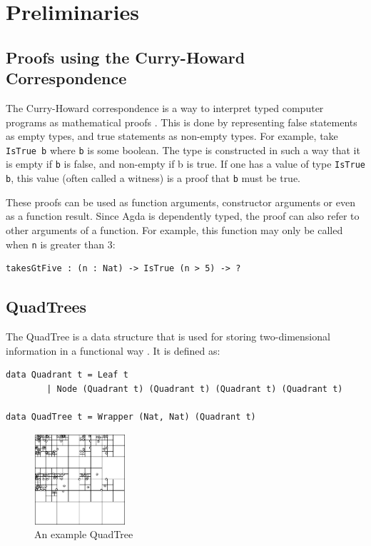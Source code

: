 \section{Preliminaries}
\subsection{Proofs using the Curry-Howard Correspondence}
The Curry-Howard correspondence is a way to interpret typed computer programs as mathematical proofs \cite{chc}. This is done by representing false statements as empty types, and true statements as non-empty types. For example, take  \verb|IsTrue b|  where  \verb|b| is some boolean. The type is constructed in such a way that it is empty if  \verb|b| is false, and non-empty if b is true.  If one has a value of type  \verb|IsTrue b|, this value (often called a witness) is a proof that  \verb|b| must be true. 

These proofs can be used as function arguments, constructor arguments or even as a function result. Since Agda is dependently typed, the proof can also refer to other arguments of a function. For example, this function may only be called when \verb|n| is greater than 3:
\begin{verbatim}
takesGtFive : (n : Nat) -> IsTrue (n > 5) -> ?
\end{verbatim}

\subsection{QuadTrees}
The QuadTree is a data structure that is used for storing two-dimensional information in a functional way \cite{Finkel1974}. It is defined as:
\begin{verbatim}
data Quadrant t = Leaf t
        | Node (Quadrant t) (Quadrant t) (Quadrant t) (Quadrant t)

data QuadTree t = Wrapper (Nat, Nat) (Quadrant t)
\end{verbatim}

\begin{figure} %
    \includegraphics[width=0.3\textwidth]{graphics/test.png}
    \caption{An example QuadTree}
    \label{quadtree}
\end{figure}

